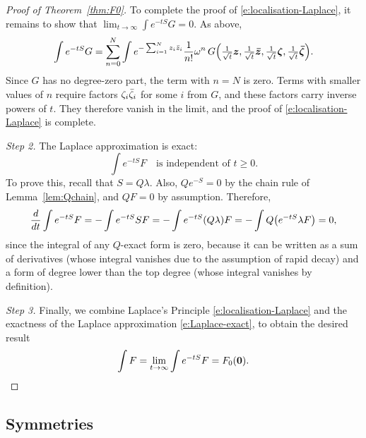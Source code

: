 \documentclass[11pt,a4paper]{article}
\let\originalleft\left
\let\originalright\right
\renewcommand{\left}{\mathopen{}\mathclose\bgroup\originalleft}
\renewcommand{\right}{\aftergroup\egroup\originalright}
\begin{document}
\begin{proof}[Proof of Theorem~\ref{thm:F0}]
To complete the proof of \eqref{e:localisation-Laplace}, it remains to
show that $\lim_{t\to\infty}\int e^{-t S}G = 0$.  As above,
\begin{equation}
    \int e^{-t S}G
    =
    \sum_{n=0}^{N} \int e^{-\sum_{i=1}^{N}\phi_{i} \phib_{i}} \frac{1}{n!}
    \omega^{n}\,
    G \left(
    \tfrac{1}{\sqrt{t}}\V{\phi},
    \tfrac{1}{\sqrt{t}}\V{\phib},
    \tfrac{1}{\sqrt{t}}\V{\psi},
    \tfrac{1}{\sqrt{t}}\V{\psib}
    \right).
\end{equation}
Since $G$ has no degree-zero part, the term with $n=N$ is zero.  Terms
with smaller values of $n$ require factors $\zeta_i\bar \zeta_i$ for some $i$ from $G$,
and these factors carry inverse powers of $t$.  They therefore vanish in the limit, and the
proof of \eqref{e:localisation-Laplace} is complete.

\smallskip
\noindent
\emph{Step 2.}
The Laplace approximation is exact:
\begin{equation} \label{e:Laplace-exact}
  \int e^{-t S}F \quad \text{is independent of $t \ge 0$.}
\end{equation}
To prove this, recall that $S = Q\lambda$.
Also, $Q e^{-S}=0$ by the chain rule of Lemma~\ref{lem:Qchain}, 
and $QF=0$ by assumption.  Therefore,
\begin{equation}
     \label{e:dlam}
    \frac{d}{dt} \int e^{-t S}F
    =
    -\int e^{-t S} S  F
    =
    -\int e^{-t S} (Q \lambda)  F
    =
    -\int Q\left(e^{-t S} \lambda F \right)
    =
    0 ,
\end{equation}
since the integral of any $Q$-exact form is zero, because it can be
written as a sum of derivatives (whose integral vanishes due to the
assumption of rapid decay) and a form of degree lower than the top
degree (whose integral vanishes by definition).

\smallskip\noindent \emph{Step 3.} Finally, we combine Laplace's
Principle \eqref{e:localisation-Laplace} and the exactness of the
Laplace approximation \eqref{e:Laplace-exact}, to obtain the desired
result
\begin{equation*}
    \int F
    =
    \lim_{t\rightarrow \infty}
    \int e^{-t S}F
    =
    F_{0} (\boldsymbol{0}).\qedhere
\end{equation*}
\end{proof}

\subsection{Symmetries}
\label{sec:symmetries}
\end{document}
